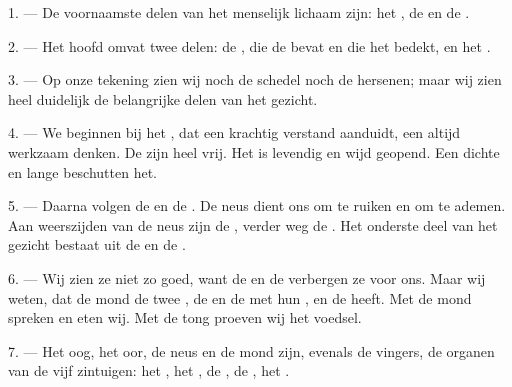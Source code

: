 
\VUsaut{4.0mm}
\VUsaut{2.0mm}

\VUsaut{2.4mm}
\VUsaut{3.0mm}

\VUsaut{3.0mm}

1. --- De voornaamste delen van het menselijk lichaam zijn: het
, de  en de .

2. --- Het hoofd omvat twee delen: de , die de
 bevat en die het  bedekt, en het
.

3. --- Op onze tekening zien wij noch de schedel noch de hersenen; maar wij zien heel
duidelijk de belangrijke delen van het gezicht.

4. --- We beginnen bij het , dat een krachtig verstand aanduidt, een altijd
werkzaam denken. De  zijn heel vrij. Het
 is levendig en wijd geopend. Een dichte  en lange
 beschutten het.

5. --- Daarna volgen de  en de . De neus dient ons om te ruiken
en om te ademen. Aan weerszijden van de neus zijn de
, verder weg de . Het onderste deel van het gezicht
bestaat uit de  en de .

6. --- Wij zien ze niet zo goed, want de  en de
 verbergen ze voor ons. Maar wij weten, dat de mond de
twee , de  en de  met hun
, en de  heeft. Met de mond spreken en eten wij. Met
de tong proeven wij het voedsel.

7. --- Het oog, het oor, de neus en de mond zijn, evenals de vingers, de organen van de vijf
zintuigen: het , het , de
, de , het .

